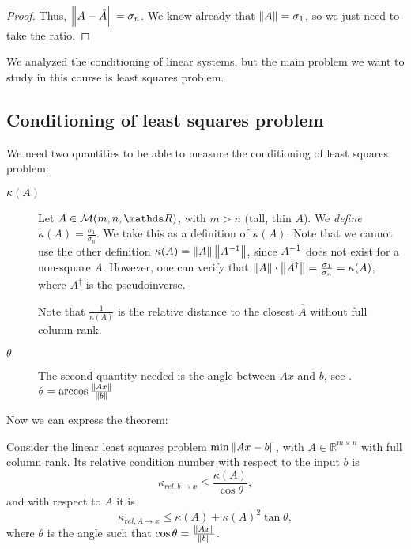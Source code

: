 \documentclass[computational_mathematics.tex]{subfiles}
\begin{document}
\begin{proof}
Thus, $\left\lVert A - \hat{A}\right\rVert = \sigma_n$. We know already that $\left\lVert A\right\rVert=\sigma_1$, so we just need to take the ratio.
\end{proof}


We analyzed the conditioning of linear systems, but the main problem we want to study in this course is least squares problem.

\subsection{Conditioning of least squares problem}

We need two quantities to be able to measure the conditioning of least squares problem:

\begin{description}
  \item[ $\kappa(A)$]
Let $A \in \mathcal{M}(m, n, \R)$, with $m > n$ (tall, thin $A$). We \emph{define} $\kappa(A) = \frac{\sigma_1}{\sigma_n}$. We take this as a definition of $\kappa(A)$. Note that we cannot use the other definition $\kappa(A)=\left\lVert A\right\rVert\left\lVert{A}^{-1}\right\rVert$, since ${A}^{-1}$ does not exist for a non-square $A$. However, one can verify that $\left\lVert A\right\rVert \cdot \left\lVert A^{\dag}\right\rVert = \frac{\sigma_1}{\sigma_n}=\kappa(A)$, where $A^\dag$ is the pseudoinverse.

\begin{obs}
  Note that $\frac{1}{\kappa(A)}$ is the relative distance to the closest $\hat{A}$ without full column rank.
\end{obs}

  \item[ $\theta$]
    The second quantity needed is the angle between $Ax$ and $b$, see .
$\theta = \arccos \frac{\left\lVert Ax\right\rVert}{\left\lVert b\right\rVert}$
\end{description}

Now we can express the theorem:

\begin{theorem}
Consider the linear least squares problem $\min \left\lVert Ax-b\right\rVert$, with $A\in\mathbb{R}^{m\times n}$ with full column rank. Its relative condition number with respect to the input $b$ is
\[
\kappa_{rel, b \to x} \leq \frac{\kappa(A)}{\cos\theta},
\]
and with respect to $A$ it is
\[
  \kappa_{rel, A \to x} \leq \kappa(A) + {\kappa(A)}^2 \tan \theta,
\]
where $\theta$ is the angle such that $\cos \theta = \frac{\left\lVert Ax\right\rVert}{\left\lVert b\right\rVert}$.
\end{theorem}
\end{document}
